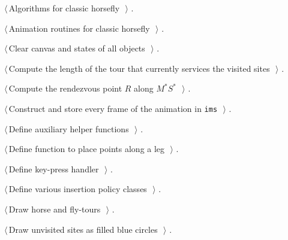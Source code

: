 \documentclass[11.5pt]{report}
\begin{document}
{\small\begin{list}{}{\setlength{\itemsep}{-\parsep}\setlength{\itemindent}{-\leftmargin}}
\item $\langle\,$Algorithms for classic horsefly\nobreak\ {\footnotesize {}}$\,\rangle$ {\footnotesize {\NWtxtRefIn} .}
\item $\langle\,$Animation routines for classic horsefly\nobreak\ {\footnotesize {}}$\,\rangle$ {\footnotesize {\NWtxtRefIn} .}
\item $\langle\,$Clear canvas and states of all objects\nobreak\ {\footnotesize {}}$\,\rangle$ {\footnotesize {\NWtxtRefIn} .}
\item $\langle\,$Compute the length of the tour that currently services the visited sites\nobreak\ {\footnotesize {}}$\,\rangle$ {\footnotesize {\NWtxtRefIn} .}
\item $\langle\,$Compute the rendezvous point $R$ along $M^{*}S^{*}$\nobreak\ {\footnotesize {}}$\,\rangle$ {\footnotesize {\NWtxtNoRef}.}
\item $\langle\,$Construct and store every frame of the animation in \verb|ims|\nobreak\ {\footnotesize {}}$\,\rangle$ {\footnotesize {\NWtxtRefIn} .}
\item $\langle\,$Define auxiliary helper functions\nobreak\ {\footnotesize {}}$\,\rangle$ {\footnotesize {\NWtxtRefIn} .}
\item $\langle\,$Define function to place points along a leg\nobreak\ {\footnotesize {}}$\,\rangle$ {\footnotesize {\NWtxtRefIn} .}
\item $\langle\,$Define key-press handler\nobreak\ {\footnotesize {}}$\,\rangle$ {\footnotesize {\NWtxtRefIn} .}
\item $\langle\,$Define various insertion policy classes\nobreak\ {\footnotesize {}}$\,\rangle$ {\footnotesize {\NWtxtRefIn} .}
\item $\langle\,$Draw horse and fly-tours\nobreak\ {\footnotesize {}}$\,\rangle$ {\footnotesize {\NWtxtRefIn} .}
\item $\langle\,$Draw unvisited sites as filled blue circles\nobreak\ {\footnotesize {}}$\,\rangle$ {\footnotesize {\NWtxtRefIn} .}

\end{list}}
\end{document}
